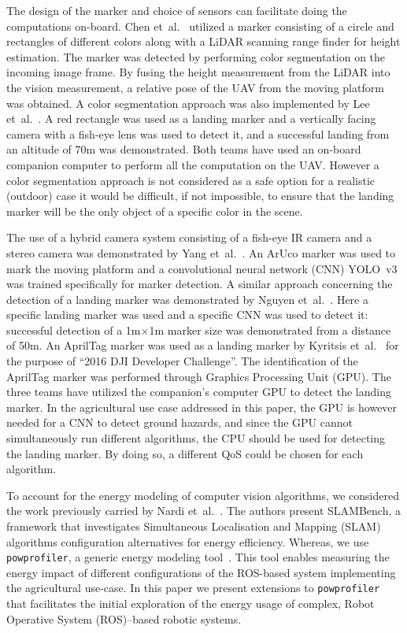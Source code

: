 \documentclass[conference]{IEEEtran}
\newcommand{\stt}[1]{{\small\tt #1}} %
\newcommand{\powprof}{\stt{powprofiler}}
\begin{document}
The design of the marker and choice of sensors can facilitate doing the computations on-board. %
%
Chen et~al.~\cite{chen2016system} utilized a marker consisting of a
circle and rectangles of different colors along with a LiDAR scanning
range finder for height estimation. The marker was detected by
performing color segmentation on the incoming image frame. By fusing
the height measurement from the LiDAR into the vision measurement, a
relative pose of the UAV from the moving platform was obtained. A
color segmentation approach was also implemented by Lee
et~al.~\cite{lee2016vision}. A red rectangle was used as a landing
marker and a vertically facing camera with a fish-eye lens was used to
detect it, and a successful landing from an altitude of 70m was
demonstrated. Both teams have used an on-board companion computer to
perform all the computation on the UAV. However a color segmentation
approach is not considered as a safe option for a realistic (outdoor)
case it would be difficult, if not impossible, to ensure that the
landing marker will be the only object of a specific color in the
scene.

The use of a hybrid camera system consisting of a fish-eye IR camera
and a stereo camera was demonstrated by Yang
et~al.~\cite{yang2018hybrid}. An ArUco marker was used to mark the
moving platform and a convolutional neural network (CNN) YOLO~v3 was
trained specifically for marker detection. A similar approach
concerning the detection of a landing marker was demonstrated by
Nguyen et~al.~\cite{nguyen2018lightdenseyolo}. Here a specific landing
marker was used and a specific CNN was used to detect it: successful
detection of a 1m$\times$1m marker size was demonstrated from a
distance of 50m. An AprilTag marker was used as a landing marker by
Kyritsis et~al.~\cite{kyristsis2016towards} for the purpose of ``2016
DJI Developer Challenge''. The identification of the AprilTag marker
was performed through Graphics Processing Unit (GPU). The three teams
have utilized the companion's computer GPU to detect the landing
marker. In the agricultural use case addressed in this paper, the GPU
is however needed for a CNN to detect ground hazards, and since the
GPU cannot simultaneously run different algorithms,
%
%
the CPU should be used for detecting the landing marker. By doing so,
a different QoS could be chosen for each algorithm.  

%
To account for the energy modeling of computer vision algorithms, we
considered the work previously carried by Nardi
et~al.~\cite{nardi2015introducing}. The authors present SLAMBench, a
framework that investigates Simultaneous Localisation and Mapping (SLAM) algorithms configuration alternatives
for energy efficiency. Whereas, we use \powprof{}, a generic energy
modeling tool~\cite{seewald2019coarse}. This tool enables measuring
the energy impact of different configurations of the ROS-based system
implementing the agricultural use-case. In this paper we present
extensions to \powprof{} that facilitates the initial exploration of
the energy usage of complex, Robot Operative System (ROS)--based robotic systems.
\end{document}
